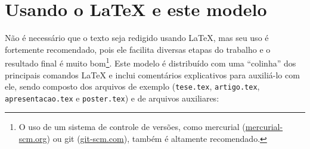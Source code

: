 
\chapter{Usando o \LaTeX{} e este modelo}

Não é necessário que o texto seja redigido usando \LaTeX{}, mas seu
uso é fortemente recomendado, pois ele facilita diversas etapas do
trabalho e o resultado final é muito bom\footnote{O uso de um sistema de
controle de versões, como mercurial (\url{mercurial-scm.org}) ou git
(\url{git-scm.com}), também é altamente recomendado.}. Este modelo é
distribuído com uma ``colinha'' dos principais comandos \LaTeX{} e inclui
comentários explicativos para auxiliá-lo com
ele, sendo composto dos arquivos de exemplo
(\texttt{tese.tex}, \texttt{artigo.tex},
\texttt{apresentacao.tex} e \texttt{poster.tex}) e de
arquivos auxiliares:

